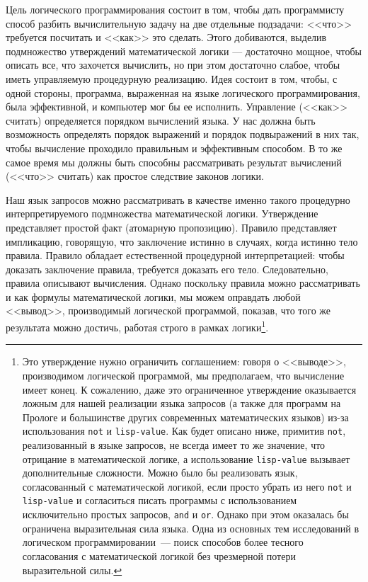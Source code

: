 Цель логического программирования состоит в том, чтобы дать
программисту способ разбить вычислительную задачу на две отдельные
подзадачи: <<что>> требуется посчитать и <<как>> это 
сделать.  Этого 
добиваются, выделив подмножество утверждений математической логики ---
достаточно мощное, чтобы описать все, что захочется вычислить,
но при этом достаточно слабое, чтобы иметь управляемую процедурную
реализацию.  Идея состоит в том, чтобы, с одной стороны, программа,
выраженная на языке логического программирования, была эффективной,
и компьютер мог бы ее исполнить.  Управление (<<как>>
считать) определяется порядком вычислений языка.  У нас должна быть
возможность определять порядок выражений и порядок подвыражений в них
так, чтобы вычисление проходило правильным и эффективным способом.  В
то же самое время мы должны быть способны рассматривать результат
вычислений (<<что>> считать) как простое следствие законов логики.

Наш язык запросов можно рассматривать в качестве именно
такого процедурно интерпретируемого подмножества математической
логики.  Утверждение представляет простой факт (атомарную
пропозицию).  Правило представляет импликацию, говорящую, что
заключение истинно в случаях, когда истинно тело правила.  Правило
обладает естественной процедурной интерпретацией: чтобы доказать
заключение правила, требуется доказать его тело.  Следовательно,
правила описывают вычисления.  Однако поскольку правила можно
рассматривать и как формулы математической логики, мы можем оправдать
любой <<вывод>>, производимый логической программой, показав, что того
же результата можно достичь, работая строго в рамках логики\footnote{Это 
утверждение нужно ограничить соглашением:
говоря о <<выводе>>, производимом логической программой, мы
предполагаем, что вычисление имеет конец.  К сожалению, даже это
ограниченное утверждение оказывается ложным для нашей реализации языка
запросов (а также для программ на Прологе и большинстве других
современных математических языков) из-за использования
{\tt not} и {\tt lisp-value}.  Как будет описано ниже,
примитив {\tt not}, реализованный в языке запросов, не всегда
имеет то же значение, что отрицание в математической логике, а
использование {\tt lisp-value} вызывает дополнительные
сложности.  Можно было бы реализовать язык, согласованный с
математической логикой, если просто убрать из него {\tt not} и
{\tt lisp-value} и согласиться писать программы с
использованием исключительно простых запросов, {\tt and} и
{\tt or}.  Однако при этом оказалась бы ограничена
выразительная сила языка.  Одна из основных тем исследований в
логическом программировании~--- поиск способов более тесного согласования с
математической логикой без чрезмерной потери выразительной силы.}.

